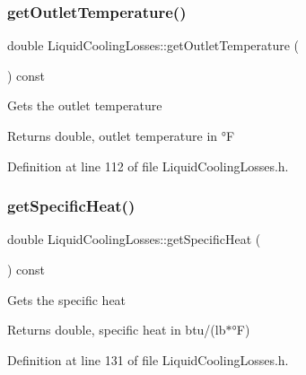 \mbox{\label{class_liquid_cooling_losses_ae6364da9b374e95dd657096350464acb}} 
\subsubsection{\texorpdfstring{get\+Outlet\+Temperature()}{getOutletTemperature()}}
{\footnotesize\ttfamily double Liquid\+Cooling\+Losses\+::get\+Outlet\+Temperature (\begin{DoxyParamCaption}{ }\end{DoxyParamCaption}) const\hspace{0.3cm}{\ttfamily [inline]}}

Gets the outlet temperature

\begin{DoxyReturn}{Returns}
double, outlet temperature in °F 
\end{DoxyReturn}


Definition at line 112 of file Liquid\+Cooling\+Losses.\+h.

\mbox{\label{class_liquid_cooling_losses_aa60623b6f1fab605d25c9c24e8dd00ec}} 
\subsubsection{\texorpdfstring{get\+Specific\+Heat()}{getSpecificHeat()}}
{\footnotesize\ttfamily double Liquid\+Cooling\+Losses\+::get\+Specific\+Heat (\begin{DoxyParamCaption}{ }\end{DoxyParamCaption}) const\hspace{0.3cm}{\ttfamily [inline]}}

Gets the specific heat

\begin{DoxyReturn}{Returns}
double, specific heat in btu/(lb$\ast$°F) 
\end{DoxyReturn}


Definition at line 131 of file Liquid\+Cooling\+Losses.\+h.

